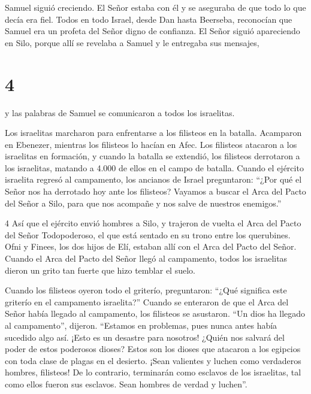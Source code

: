  Samuel siguió creciendo. El Señor estaba con él y se
aseguraba de que todo lo que decía era fiel.  Todos en todo
Israel, desde Dan hasta Beerseba, reconocían que Samuel era un profeta
del Señor digno de confianza.  El Señor siguió apareciendo
en Silo, porque allí se revelaba a Samuel y le entregaba sus mensajes,

\hypertarget{section-3}{%
\section{4}\label{section-3}}

 y las palabras de Samuel se comunicaron a todos los
israelitas.

Los israelitas marcharon para enfrentarse a los filisteos en la batalla.
Acamparon en Ebenezer, mientras los filisteos lo hacían en Afec.
 Los filisteos atacaron a los israelitas en formación, y
cuando la batalla se extendió, los filisteos derrotaron a los
israelitas, matando a 4.000 de ellos en el campo de batalla.
 Cuando el ejército israelita regresó al campamento, los
ancianos de Israel preguntaron: ``¿Por qué el Señor nos ha derrotado hoy
ante los filisteos? Vayamos a buscar el Arca del Pacto del Señor a Silo,
para que nos acompañe y nos salve de nuestros enemigos.''

4 Así que el ejército envió hombres a Silo, y trajeron de vuelta el Arca
del Pacto del Señor Todopoderoso, el que está sentado en su trono entre
los querubines. Ofni y Finees, los dos hijos de Elí, estaban allí con el
Arca del Pacto del Señor.  Cuando el Arca del Pacto del
Señor llegó al campamento, todos los israelitas dieron un grito tan
fuerte que hizo temblar el suelo.

 Cuando los filisteos oyeron todo el griterío, preguntaron:
``¿Qué significa este griterío en el campamento israelita?'' Cuando se
enteraron de que el Arca del Señor había llegado al campamento,
 los filisteos se asustaron. ``Un dios ha llegado al
campamento'', dijeron. ``Estamos en problemas, pues nunca antes había
sucedido algo así.  ¡Esto es un desastre para nosotros!
¿Quién nos salvará del poder de estos poderosos dioses? Estos son los
dioses que atacaron a los egipcios con toda clase de plagas en el
desierto.  ¡Sean valientes y luchen como verdaderos hombres,
filisteos! De lo contrario, terminarán como esclavos de los israelitas,
tal como ellos fueron sus esclavos. Sean hombres de verdad y luchen''.

